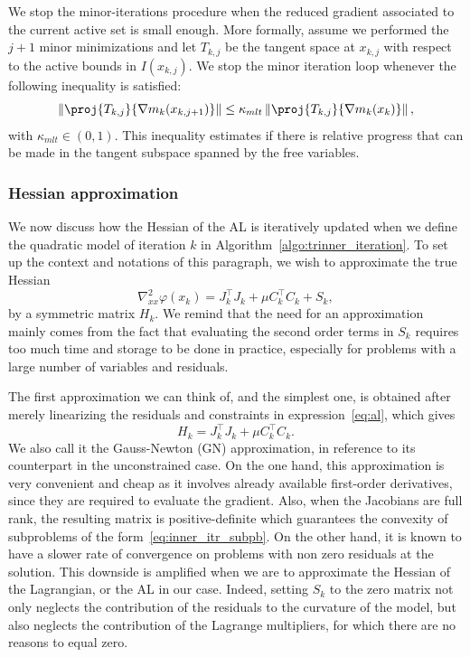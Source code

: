 We stop the minor-iterations procedure when the reduced gradient associated to the current active set is small enough. More formally, assume we performed the $j+1$ minor minimizations and let $T_{k,j}$ be the tangent space at $x_{k,j}$ with respect to the active bounds in $I(x_{k,j})$. We stop the minor iteration loop whenever the following inequality is satisfied:
\begin{equation*}
	\left\Vert \proj{T_{k,j}}{\nabla m_k(x_{k,j+1})} \right\Vert \le \kappa_{mlt} \left\Vert \proj{T_{k,j}}{\nabla m_k(x_k)}\right\Vert,
\end{equation*}
with $\kappa_{mlt} \in (0,1)$. This inequality estimates if there is relative progress that can be made in the tangent subspace spanned by the free variables. 

\subsubsection{Hessian approximation}\label{subsec:hessian_approx}

We now discuss how the Hessian of the AL is iteratively updated when we define the quadratic model of iteration $k$ in Algorithm~\ref{algo:trinner_iteration}. To set up the context and notations of this paragraph, we wish to approximate the true Hessian
\[\nabla_{xx}^2 \varphi(x_k) = J_k^\top J_k + \mu C_k^\top C_k + S_k,\]  
by a symmetric matrix $H_k$.
We remind that the need for an approximation mainly comes from the fact that evaluating the second order terms in $S_k$ requires too much time and storage to be done in practice, especially for problems with a large number of variables and residuals.

The first approximation we can think of, and the simplest one, is obtained after merely linearizing the residuals and constraints in expression~\eqref{eq:al}, which gives
\begin{equation}\label{eq:hessian_gn_approx}
	H_k = J_k^\top J_k + \mu C_k^\top C_k.
\end{equation}
We also call it the Gauss-Newton (GN) approximation, in reference to its counterpart in the unconstrained case. On the one hand, this approximation is very convenient and cheap as it involves already available first-order derivatives, since they are required to evaluate the gradient. Also, when the Jacobians are full rank, the resulting matrix is positive-definite which guarantees the convexity of subproblems of the form~\eqref{eq:inner_itr_subpb}. On the other hand, it is known to have a slower rate of convergence on problems with non zero residuals at the solution. This downside is amplified when we are to approximate the Hessian of the Lagrangian, or the AL in our case. Indeed, setting $S_k$ to the zero matrix not only neglects the contribution of the residuals to the curvature of the model, but also neglects the contribution of the Lagrange multipliers, for which there are no reasons to equal zero.

